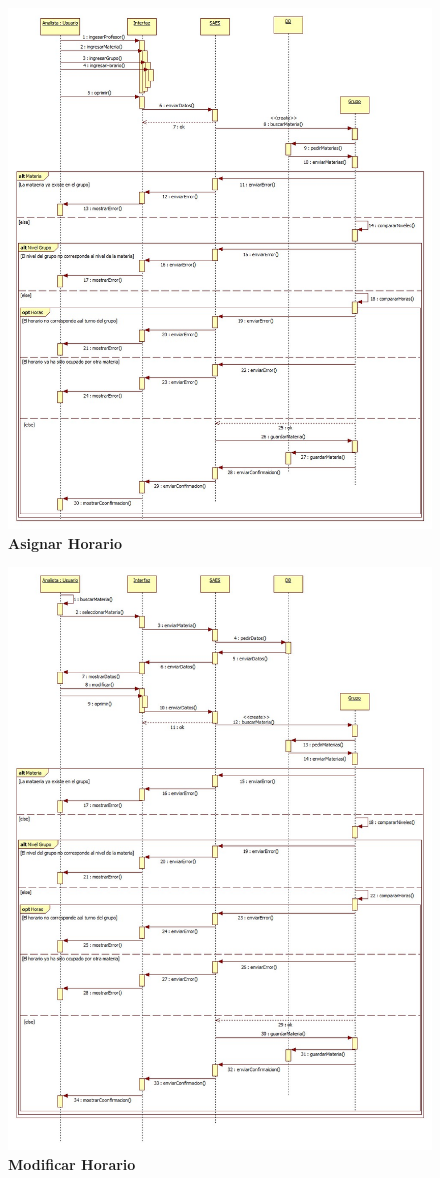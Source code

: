 \begin{figure}[H]
  \centering
    \includegraphics[scale=0.5,angle=0]{project/Secuencia/Asignar_Horario.jpg}
  \caption{\textbf{Asignar Horario}}
\end{figure}
\begin{figure}[H]
  \centering
    \includegraphics[scale=0.5,angle=0]{project/Secuencia/Modificar_Horario.jpg}
  \caption{\textbf{Modificar Horario}}
\end{figure}